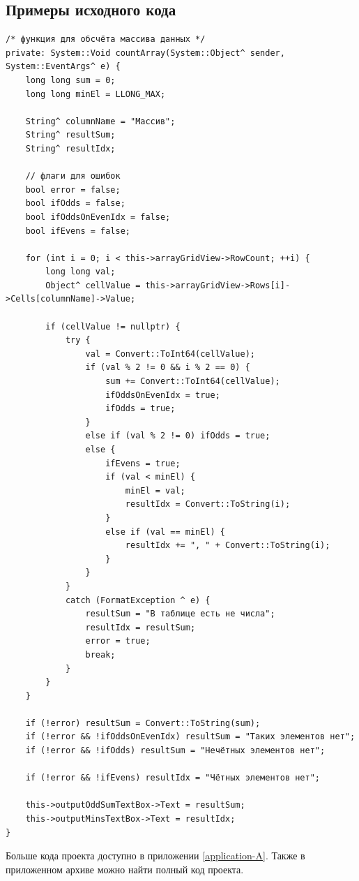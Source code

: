 \subsection{Примеры исходного кода}
\begin{verbatim}
/* функция для обсчёта массива данных */
private: System::Void countArray(System::Object^ sender, System::EventArgs^ e) {
    long long sum = 0;
    long long minEl = LLONG_MAX;
    
    String^ columnName = "Массив";
    String^ resultSum;
    String^ resultIdx;

    // флаги для ошибок
    bool error = false;
    bool ifOdds = false;
    bool ifOddsOnEvenIdx = false;
    bool ifEvens = false;
    
    for (int i = 0; i < this->arrayGridView->RowCount; ++i) {
        long long val;
        Object^ cellValue = this->arrayGridView->Rows[i]->Cells[columnName]->Value;
    
        if (cellValue != nullptr) {
            try {
                val = Convert::ToInt64(cellValue);
                if (val % 2 != 0 && i % 2 == 0) {
                    sum += Convert::ToInt64(cellValue);
                    ifOddsOnEvenIdx = true;
                    ifOdds = true;
                }
                else if (val % 2 != 0) ifOdds = true;
                else {
                    ifEvens = true;
                    if (val < minEl) {
                        minEl = val;
                        resultIdx = Convert::ToString(i);
                    }
                    else if (val == minEl) {
                        resultIdx += ", " + Convert::ToString(i);
                    }
                }
            }
            catch (FormatException ^ e) {
                resultSum = "В таблице есть не числа";
                resultIdx = resultSum;
                error = true;
                break;
            }
        }
    }
    
    if (!error) resultSum = Convert::ToString(sum);
    if (!error && !ifOddsOnEvenIdx) resultSum = "Таких элементов нет";
    if (!error && !ifOdds) resultSum = "Нечётных элементов нет";
    
    if (!error && !ifEvens) resultIdx = "Чётных элементов нет";
    
    this->outputOddSumTextBox->Text = resultSum;
    this->outputMinsTextBox->Text = resultIdx;
}
\end{verbatim}

Больше кода проекта доступно в приложении \ref{application-A}. Также в приложенном архиве можно найти полный код проекта.
